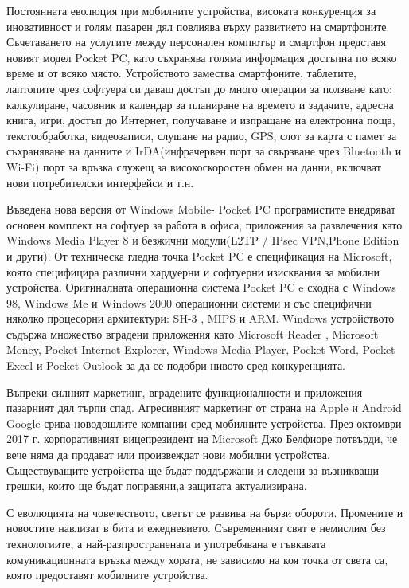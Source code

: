 Постоянната еволюция при мобилните устройства, високата конкуренция за иновативност и голям пазарен дял повлиява върху развитието на смартфоните. Съчетаването на услугите между персонален компютър и смартфон представя новият модел Pocket PC, като съхранява голяма  информация  достъпна по всяко време и от всяко място. Устройството замества смартфоните, таблетите, лаптопите чрез софтуера си даващ достъп до много операции за ползване като: калкулиране, часовник и календар за планиране на времето и задачите, адресна книга, игри, достъп до Интернет, получаване и изпращане на електронна поща,  текстообработка, видеозаписи, слушане на радио, GPS, слот за карта с памет за съхраняване на данните и IrDA(инфрачервен порт за свързване чрез  Bluetooth и Wi-Fi) порт за връзка служещ за високоскоростен обмен на данни, включват нови потребителски интерфейси и т.н.

Въведена нова версия от Windows Mobile- Pocket PC програмистите внедряват основен комплект на софтуер за работа в офиса, приложения за развлечения като Windows Media Player 8 и безжични модули(L2TP / IPsec VPN,Phone Edition и други). От техническа гледна точка Pocket PC е спецификация на Microsoft, която специфицира различни хардуерни и софтуерни изисквания за мобилни устройства. Оригиналната операционна система Pocket PC e сходна с Windows 98, Windows Me и Windows 2000 операционни системи и със специфични няколко процесорни архитектури: SH-3 , MIPS и ARM. Windows устройството съдържа множество вградени приложения като Microsoft Reader , Microsoft Money, Pocket Internet Explorer, Windows Media Player, Pocket Word, Pocket Excel и Pocket Outlook за да се подобри нивото сред конкуренцията.

Въпреки силният маркетинг, вградените функционалности и приложения пазарният дял търпи спад. Агресивният маркетинг от страна на Apple и Android Google срива новодошлите компании сред мобилните устройства. През октомври 2017 г. корпоративният вицепрезидент на Microsoft Джо Белфиоре потвърди, че вече няма да продават или произвеждат нови мобилни устройства. Съществуващите устройства ще бъдат поддържани и следени за възникващи грешки, които ще бъдат поправяни,а  защитата актуализирана.

С еволюцията на човечеството, светът се развива на бързи обороти. Промените и новостите навлизат в бита и ежедневието. Съвременният свят е немислим без технологиите, а най-разпространената и употребявана е гъвкавата комуникационната връзка между хората, не зависимо на коя точка от света са, която предоставят мобилните устройства.

